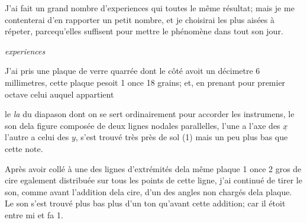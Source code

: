 \documentclass[11pt,a4paper]{article}
\begin{document}
J'ai fait un grand nombre d'experiences qui   toutes
 le même résultat; mais je me contenterai d'en
rapporter un petit nombre, et je choisirai les plus aisées
à répeter, parcequ'elles suffisent pour mettre le phénomène
dans tout son jour.

\emph{experiences}

J'ai pris une plaque de verre quarrée dont le côté avoit
un décimetre 6 millimetres, cette plaque pesoit 1 once 18 grains;
et, en prenant pour premier octave celui auquel appartient


le \emph{la} du diapason dont on se sert ordinairement pour
accorder les instrumens, le son dela figure composée de
deux lignes nodales parallelles, l'une a l'axe des $\underline{x}$ l'autre
a celui des $y$, s'est trouvé très près de sol (1) mais
un peu plus bas que cette note.

Après avoir collé à une des lignes d'extrémités dela
même plaque 1 once 2 gros de cire egalement distribuée
sur tous les points de cette ligne, j'ai continué de
tirer le son, comme avant l'addition dela cire, d'un
des angles non chargés dela plaque. Le son s'est
trouvé plus bas  plus d'un ton qu'avant cette
addition; car il étoit entre mi et fa 1.
\end{document}
